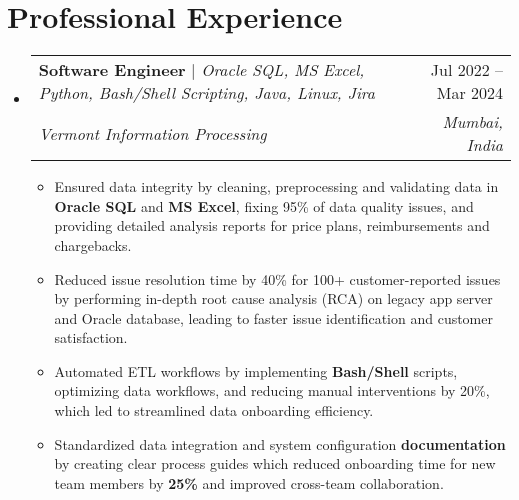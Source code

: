 \documentclass[letterpaper,11pt]{article}
\makeatletter
\newcommand{\resumeItem}[1]{
  \item\small{
    {#1 \vspace{-2pt}}
  }
}
\newcommand{\resumeExperienceSubheading}[5]{
  \vspace{-2pt}\item
    \begin{tabular*}{0.97\textwidth}[t]{l@{\extracolsep{\fill}}r}
      \textbf{#1} \emph{\small#2} & #3 \\
      \textit{\small#4} & \textit{\small #5} \\
    \end{tabular*}\vspace{-7pt}
}
\newcommand{\resumeSubSubheading}[2]{
    \item
    \begin{tabular*}{0.97\textwidth}{l@{\extracolsep{\fill}}r}
      \textit{\small#1} & \textit{\small #2} \\
    \end{tabular*}\vspace{-7pt}
}
\newcommand{\resumeSubHeadingListStart}{\begin{itemize}[leftmargin=0.15in, label={}]}
\newcommand{\resumeSubHeadingListEnd}{\end{itemize}}
\newcommand{\resumeItemListStart}{\begin{itemize}}
\newcommand{\resumeItemListEnd}{\end{itemize}\vspace{-5pt}}
\makeatother
\begin{document}
\section{Professional Experience}
  \resumeSubHeadingListStart

    \resumeExperienceSubheading
      {Software Engineer}{$|$ Oracle SQL, MS Excel, Python, Bash/Shell Scripting, Java, Linux, Jira}{Jul 2022 -- Mar 2024}
      {Vermont Information Processing}{Mumbai, India}
      
      \resumeItemListStart
        \resumeItem{Ensured data integrity by cleaning, preprocessing and validating data in \textbf{Oracle SQL} and \textbf{MS Excel}, fixing 95\% of data quality issues, and providing detailed analysis reports for price plans, reimbursements and chargebacks.}
        \resumeItem{Reduced issue resolution time by 40\% for 100+ customer-reported issues by performing in-depth root cause analysis (RCA) on legacy app server and Oracle database, leading to faster issue identification and customer satisfaction.}
        \resumeItem{Automated ETL workflows by implementing \textbf{Bash/Shell} scripts, optimizing data workflows, and reducing manual interventions by 20\%, which led to streamlined data onboarding efficiency.}
        \resumeItem{Standardized data integration and system configuration \textbf{documentation} by creating clear process guides which reduced onboarding time for new team members by \textbf{25\%} and improved cross-team collaboration.}
      \resumeItemListEnd
      

  \resumeSubHeadingListEnd


\end{document}
